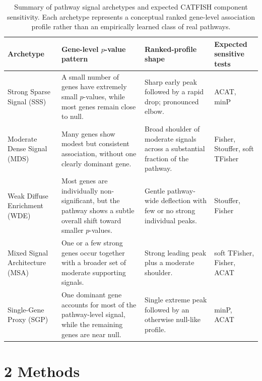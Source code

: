 \documentclass[unnumsec,webpdf,contemporary,large]{oup-authoring-template}%
\theoremstyle{thmstyleone}%
\theoremstyle{thmstyletwo}%
\theoremstyle{thmstylethree}%
\begin{document}
\begin{table}[p]
\centering
\caption{Summary of pathway signal archetypes and expected CATFISH component sensitivity.
Each archetype represents a conceptual ranked gene-level association profile rather than an empirically learned class of real pathways.}
\label{tab:archetype_summary}
\scriptsize
\setlength{\tabcolsep}{4pt}
\begin{tabular}{p{} p{} p{} p{}}
\hline
\textbf{Archetype} & \textbf{Gene-level $p$-value pattern} & \textbf{Ranked-profile shape} & \textbf{Expected sensitive tests} \\
\hline

Strong Sparse Signal (SSS) &
A small number of genes have extremely small $p$-values, while most genes remain close to null. &
Sharp early peak followed by a rapid drop; pronounced elbow. &
ACAT, minP \\

Moderate Dense Signal (MDS) &
Many genes show modest but consistent association, without one clearly dominant gene. &
Broad shoulder of moderate signals across a substantial fraction of the pathway. &
Fisher, Stouffer, soft TFisher \\

Weak Diffuse Enrichment (WDE) &
Most genes are individually non-significant, but the pathway shows a subtle overall shift toward smaller $p$-values. &
Gentle pathway-wide deflection with few or no strong individual peaks. &
Stouffer, Fisher \\

Mixed Signal Architecture (MSA) &
One or a few strong genes occur together with a broader set of moderate supporting signals. &
Strong leading peak plus a moderate shoulder. &
soft TFisher, Fisher, ACAT \\

Single-Gene Proxy (SGP) &
One dominant gene accounts for most of the pathway-level signal, while the remaining genes are near null. &
Single extreme peak followed by an otherwise null-like profile. &
minP, ACAT \\

\hline
\end{tabular}
\end{table}


\section{2 Methods}
\end{document}

